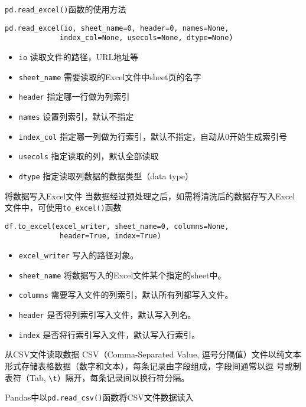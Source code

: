 \documentclass[t]{beamer}
\begin{document}
\begin{frame}[fragile]{\texttt{pd.read\_excel()}函数的使用方法}
\begin{lstlisting}
pd.read_excel(io, sheet_name=0, header=0, names=None, 
             index_col=None, usecols=None, dtype=None)
\end{lstlisting}
\begin{itemize}
    \item \verb|io| 读取文件的路径，URL地址等
    \item \verb|sheet_name| 需要读取的Excel文件中sheet页的名字
    \item  \verb|header| 指定哪一行做为列索引
    \item  \verb|names| 设置列索引，默认不指定
    \item   \verb|index_col| 指定哪一列做为行索引，默认不指定，自动从0开始生成索引号
    \item  \verb|usecols| 指定读取的列，默认全部读取
    \item  \verb|dtype| 指定读取列数据的数据类型（data type）
\end{itemize}


\end{frame}


\begin{frame}[fragile]{将数据写入Excel文件}
    当数据经过预处理之后，如需将清洗后的数据存写入Excel文件中，可使用\verb|to_excel()|函数
\begin{lstlisting}
df.to_excel(excel_writer, sheet_name=0, columns=None,
             header=True, index=True)
\end{lstlisting}
\begin{itemize}
    \item  \verb|excel_writer| 写入的路径对象。
    \item  \verb|sheet_name| 将数据写入的Excel文件某个指定的sheet中。
    \item  \verb|columns| 需要写入文件的列索引，默认所有列都写入文件。
    \item   \verb|header| 是否将列索引写入文件，默认写入列名。
    \item  \verb|index| 是否将行索引写入文件，默认写入行索引。
\end{itemize}
\end{frame}

\begin{frame}[fragile]{从CSV文件读取数据}
CSV（Comma-Separated Value, 逗号分隔值）文件以纯文本形式存储表格数据（数字和文本），每条记录由字段组成，字段间通常以逗
号或制表符（Tab, \verb|\t|）隔开，每条记录间以换行符分隔。

Pandas中以\verb|pd.read_csv()|函数将CSV文件数据读入
\end{frame}
\end{document}
